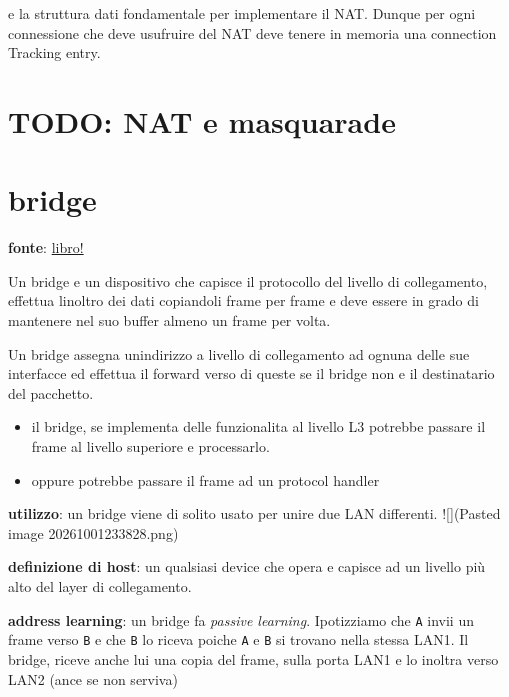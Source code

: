 e\textquotesingle{} la struttura dati fondamentale per implementare il
NAT. Dunque per ogni connessione che deve usufruire del NAT deve tenere
in memoria una connection Tracking entry.

\section{TODO: NAT e masquarade}\label{todo-nat-e-masquarade}

\section{bridge}\label{bridge}

\textbf{fonte}:
\href{https://books.google.it/books?hl=en&lr=&id=ALapr7CvAKkC&oi=fnd&pg=PR5&dq=linux+bridges+L2&ots=gYfwjUhYJn&sig=9yrrq3kOgtMhkfkJiZP9hF1BgRw&redir_esc=y\#v=onepage&q&f=true}{libro!}

Un bridge e\textquotesingle{} un dispositivo che capisce il protocollo
del livello di collegamento, effettua l\textquotesingle inoltro dei dati
copiandoli frame per frame e deve essere in grado di mantenere nel suo
buffer almeno un frame per volta.

Un bridge assegna un\textquotesingle indirizzo a livello di collegamento
ad ognuna delle sue interfacce ed effettua il forward verso di queste se
il bridge non e\textquotesingle{} il destinatario del pacchetto.

\begin{itemize}
\tightlist
\item
  il bridge, se implementa delle funzionalita al livello L3 potrebbe
  passare il frame al livello superiore e processarlo.
\item
  oppure potrebbe passare il frame ad un protocol handler
\end{itemize}

\textbf{utilizzo}: un bridge viene di solito usato per unire due LAN
differenti. !{[}{]}(Pasted image 20261001233828.png)

\textbf{definizione di host}: un qualsiasi device che opera e capisce ad
un livello più alto del layer di collegamento.

\textbf{address learning}: un bridge fa \emph{passive learning}.
Ipotizziamo che \passthrough{\lstinline!A!} invii un frame verso
\passthrough{\lstinline!B!} e che \passthrough{\lstinline!B!} lo riceva
poiche \passthrough{\lstinline!A!} e \passthrough{\lstinline!B!} si
trovano nella stessa LAN1. Il bridge, riceve anche lui una copia del
frame, sulla porta LAN1 e lo inoltra verso LAN2 (ance se non serviva)

